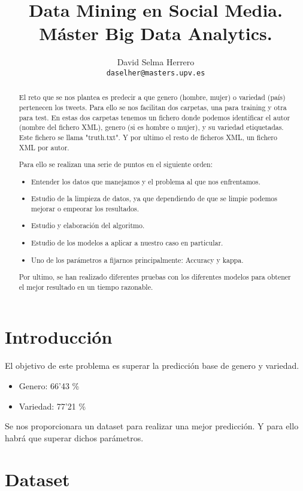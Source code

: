 \documentclass[11pt,a4paper]{article}
\title{Data Mining en Social Media. M\'aster Big Data Analytics.}
\author{David Selma Herrero \\
  {\tt daselher@masters.upv.es} \\}
\date{}
\begin{document}
\maketitle
\begin{abstract}
  El reto que se nos plantea es predecir a que genero (hombre, mujer) o variedad (pa\'is) pertenecen los tweets. Para ello se nos facilitan dos carpetas, una para training y otra para test. En estas dos carpetas tenemos un fichero donde podemos identificar el autor (nombre del fichero XML), genero (si es hombre o mujer), y su variedad etiquetadas. Este fichero se llama "truth.txt". Y por ultimo el resto de ficheros XML, un fichero XML por autor.
  
  Para ello se realizan una serie de puntos en el siguiente orden:
  \begin{itemize}
  \item Entender los datos que manejamos y el problema al que nos enfrentamos.
  \item Estudio de la limpieza de datos, ya que dependiendo de que se limpie podemos mejorar o empeorar los resultados.
  \item Estudio y elaboraci\'on del algoritmo.
  \item Estudio de los modelos a aplicar a nuestro caso en particular.
  \item Uno de los par\'ametros a fijarnos principalmente: Accuracy y kappa.
  \end{itemize}
  
  Por ultimo, se han realizado diferentes pruebas con los diferentes modelos para obtener el mejor resultado en un tiempo razonable.
  
\end{abstract}


\section{Introducci\'on}

El objetivo de este problema es superar la predicci\'on base de genero y variedad.
  \begin{itemize}
  \item Genero: 66'43 \%
  \item Variedad: 77'21 \%
  \end{itemize}
  
  Se nos proporcionara un dataset para realizar una mejor predicci\'on. Y para ello habr\'a que superar dichos par\'ametros.
  
\section{Dataset}
\end{document}
